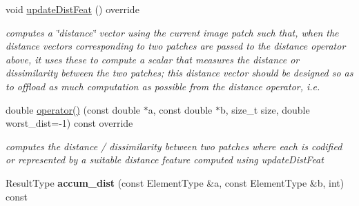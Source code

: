 \begin{DoxyCompactItemize}
\item 
void \hyperlink{classSPSS_a3de6447fe362e409c2c929f9c7e8661e}{update\-Dist\-Feat} () override
\begin{DoxyCompactList}\small\item\em computes a \char`\"{}distance\char`\"{} vector using the current image patch such that, when the distance vectors corresponding to two patches are passed to the distance operator above, it uses these to compute a scalar that measures the distance or dissimilarity between the two patches; this distance vector should be designed so as to offload as much computation as possible from the distance operator, i.\-e. \end{DoxyCompactList}\item 
\hypertarget{classSPSS_a3b66aa6526f7389dc6a7f295b860c004}{double \hyperlink{classSPSS_a3b66aa6526f7389dc6a7f295b860c004}{operator()} (const double $\ast$a, const double $\ast$b, size\-\_\-t size, double worst\-\_\-dist=-\/1) const override}\label{classSPSS_a3b66aa6526f7389dc6a7f295b860c004}

\begin{DoxyCompactList}\small\item\em computes the distance / dissimilarity between two patches where each is codified or represented by a suitable distance feature computed using update\-Dist\-Feat \end{DoxyCompactList}\item 
\hypertarget{classSPSS_a4466ee063ee9ccc31aac460cf1d3e1e7}{Result\-Type {\bfseries accum\-\_\-dist} (const Element\-Type \&a, const Element\-Type \&b, int) const }\label{classSPSS_a4466ee063ee9ccc31aac460cf1d3e1e7}

\end{DoxyCompactItemize}
